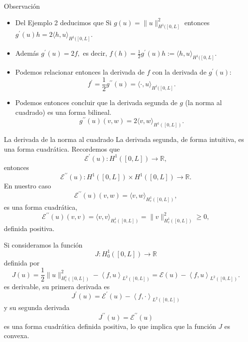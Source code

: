 \documentclass[10pt,handout]{beamer}
\theoremstyle{plain} %
\theoremstyle{plain} %
\theoremstyle{plain} %
\theoremstyle{plain} %
\theoremstyle{definition}
\theoremstyle{example}
\theoremstyle{example}
\theoremstyle{remark}
\theoremstyle{remark}
\begin{document}
    \begin{frame}{Observación}
   \begin{itemize} 
    \item Del Ejemplo 2 deducimos que Si $g(u)=\|u\|_{ H^1([0,L]}^2$ entonces $g^{\prime}(u)h = 2 \langle h, u\rangle_{ H^1([0,L]}.$
    \item Además $g^{\prime}(u)=2f,$ es decir,  $f(h) = \frac{1}{2} g^{\prime}(u)h:= \langle h, u\rangle_{ H^1([0,L]}.$ 
    \item Podemos relacionar entonces la derivada de $f$ con la derivada de $g^{\prime}(u):$   $$f^{\prime} = \frac{1}{2}g^{\prime \prime}(u) = \langle \cdot , u\rangle_{ H^1([0,L]}.$$
    \item Podemos entonces concluir que la derivada segunda de $g$ (la norma al cuadrado) es una forma bilineal.
    $$
    g^{\prime \prime}(u)(v,w) =  2\langle v, w \rangle_{H^1([0,L])}.
    $$
   \end{itemize}
        \end{frame}
\begin{frame}{La derivada de la norma al cuadrado}
La derivada segunda, de forma intuitiva, es una forma cuadrática. Recordemos que
$$
\mathcal{E}^{\prime}(u):H^1([0,L]) \longrightarrow \mathbb{R},
$$
entonces
$$
\mathcal{E}^{\prime \prime}(u):H^1([0,L]) \times H^1([0,L]) \longrightarrow \mathbb{R}.
$$
En nuestro caso
$$
\mathcal{E}^{\prime \prime}(u)(v,w) =  \langle v, w \rangle_{H^1_c([0,L])},
$$
es una forma cuadrática,
$$
\mathcal{E}^{\prime \prime}(u)(v,v) =  \langle v, v \rangle_{H^1_c([0,L])} = \|v\|_{H^1_c([0,L])}^2 \ge 0,
$$
definida positiva.
\end{frame}

\begin{frame}
Si consideramos la función
$$
J:H_0^1([0,L]) \longrightarrow \mathbb{R}
$$
definida por
$$
J(u) = \frac{1}{2}  \|u\|_{H^1_c([0,L])}^2 - \left\langle f, u \right\rangle_{L^2([0,L])}
= \mathcal{E}(u) - \left\langle f, u \right\rangle_{L^2([0,L])}.
$$
es derivable, su primera derivada es
$$
J^{\prime}(u) = \mathcal{E}^{\prime}(u) - \left\langle f, \cdot \right\rangle_{L^2([0,L])}
$$
y su segunda derivada
$$
J^{\prime \prime }(u) = \mathcal{E}^{\prime \prime }(u)
$$
es una forma cuadrática definida positiva, lo que implica que la función $J$ es convexa.
\end{frame}
\end{document}
